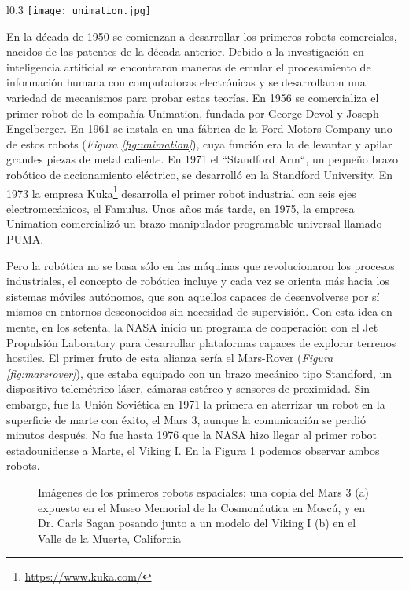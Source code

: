 \begin{wrapfigure}{l}{0.3\textwidth}
	\centering
	\texttt{[image: unimation.jpg]}
	\caption{Robot de Unimation usado por Ford en 1961.} \label{fig:unimation}
\end{wrapfigure}
En la década de 1950 se comienzan a desarrollar los primeros robots comerciales, nacidos de las patentes de la década anterior. Debido a la investigación en inteligencia artificial se encontraron maneras de emular el procesamiento de información humana con computadoras electrónicas y se desarrollaron una variedad de mecanismos para probar estas teorías. En 1956 se comercializa el primer robot de la compañía Unimation, fundada por George Devol y Joseph Engelberger. En 1961 se instala en una fábrica de la Ford Motors Company uno de estos robots (\textit{Figura \ref{fig:unimation}}), cuya función era la de levantar y apilar grandes piezas de metal caliente. En 1971 el “Standford Arm“, un pequeño brazo robótico de accionamiento eléctrico, se desarrolló en la Standford University. En 1973 la empresa Kuka\footnote{\url{https://www.kuka.com/}} desarrolla el primer robot industrial con seis ejes electromecánicos, el Famulus. Unos años más tarde, en 1975, la empresa Unimation comercializó un brazo manipulador programable universal llamado PUMA.

Pero la robótica no se basa sólo en las máquinas que revolucionaron los procesos industriales, el concepto de robótica incluye y cada vez se orienta más hacia los sistemas móviles autónomos, que son aquellos capaces de desenvolverse por sí mismos en entornos desconocidos sin necesidad de supervisión. Con esta idea en mente, en los setenta, la NASA inicio un programa de cooperación con el Jet Propulsión Laboratory para desarrollar plataformas capaces de explorar terrenos hostiles. El primer fruto de esta alianza sería el Mars-Rover (\textit{Figura \ref{fig:marsrover}}), que estaba equipado con un brazo mecánico tipo Standford, un dispositivo telemétrico láser, cámaras estéreo y sensores de proximidad. Sin embargo, fue la Unión Soviética en 1971 la primera en aterrizar un robot en la superficie de marte con éxito, el Mars 3, aunque la comunicación se perdió minutos después. No fue hasta 1976 que la NASA hizo llegar al primer robot estadounidense a Marte, el Viking I. En la Figura \ref{fig:vikingmars} podemos observar ambos robots.

\begin{figure}[t]
	\centering
	\hspace{0.05\textwidth}
	\caption[Los primeros robots espaciales, el Mars 3 y el Viking I]{Imágenes de los primeros robots espaciales: una copia del Mars 3 (a) expuesto en el Museo Memorial de la Cosmonáutica en Moscú, y en Dr. Carls Sagan posando junto a un modelo del Viking I (b) en el Valle de la Muerte, California} \label{fig:vikingmars}
\end{figure}

